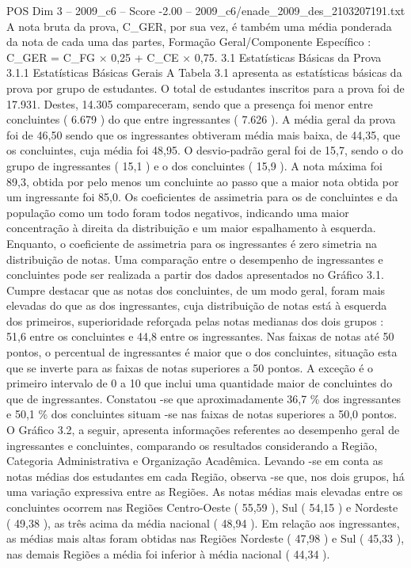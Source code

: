 \begin{textsample}{POS Dim 3 – 2009\_c6 – Score -2.00 – 2009\_c6/enade\_2009\_des\_2103207191.txt}
A nota bruta da prova, C\_GER, por sua vez, é também uma média ponderada da nota de cada uma das partes, Formação Geral/Componente Específico : C\_GER = C\_FG × 0,25 + C\_CE × 0,75. 3.1 Estatísticas Básicas da Prova 3.1.1 Estatísticas Básicas Gerais A Tabela 3.1 apresenta as estatísticas básicas da prova por grupo de estudantes.
O total de estudantes inscritos para a prova foi de 17.931.
Destes, 14.305 compareceram, sendo que a presença foi menor entre concluintes ( 6.679 ) do que entre ingressantes ( 7.626 ).
A média geral da prova foi de 46,50 sendo que os ingressantes obtiveram média mais baixa, de 44,35, que os concluintes, cuja média foi 48,95.
O desvio-padrão geral foi de 15,7, sendo o do grupo de ingressantes ( 15,1 ) e o dos concluintes ( 15,9 ).
A nota máxima foi 89,3, obtida por pelo menos um concluinte ao passo que a maior nota obtida por um ingressante foi 85,0.
Os coeficientes de assimetria para os de concluintes e da população como um todo foram todos negativos, indicando uma maior concentração à direita da distribuição e um maior espalhamento à esquerda.
Enquanto, o coeficiente de assimetria para os ingressantes é zero simetria na distribuição de notas.
Uma comparação entre o desempenho de ingressantes e concluintes pode ser realizada a partir dos dados apresentados no Gráfico 3.1.
Cumpre destacar que as notas dos concluintes, de um modo geral, foram mais elevadas do que as dos ingressantes, cuja distribuição de notas está à esquerda dos primeiros, superioridade reforçada pelas notas medianas dos dois grupos : 51,6 entre os concluintes e 44,8 entre os ingressantes.
Nas faixas de notas até 50 pontos, o percentual de ingressantes é maior que o dos concluintes, situação esta que se inverte para as faixas de notas superiores a 50 pontos.
A exceção é o primeiro intervalo de 0 a 10 que inclui uma quantidade maior de concluintes do que de ingressantes.
Constatou -se que aproximadamente 36,7 \% dos ingressantes e 50,1 \% dos concluintes situam -se nas faixas de notas superiores a 50,0 pontos.
O Gráfico 3.2, a seguir, apresenta informações referentes ao desempenho geral de ingressantes e concluintes, comparando os resultados considerando a Região, Categoria Administrativa e Organização Acadêmica.
Levando -se em conta as notas médias dos estudantes em cada Região, observa -se que, nos dois grupos, há uma variação expressiva entre as Regiões.
As notas médias mais elevadas entre os concluintes ocorrem nas Regiões Centro-Oeste ( 55,59 ), Sul ( 54,15 ) e Nordeste ( 49,38 ), as três acima da média nacional ( 48,94 ).
Em relação aos ingressantes, as médias mais altas foram obtidas nas Regiões Nordeste ( 47,98 ) e Sul ( 45,33 ), nas demais Regiões a média foi inferior à média nacional ( 44,34 ).

\end{textsample}
